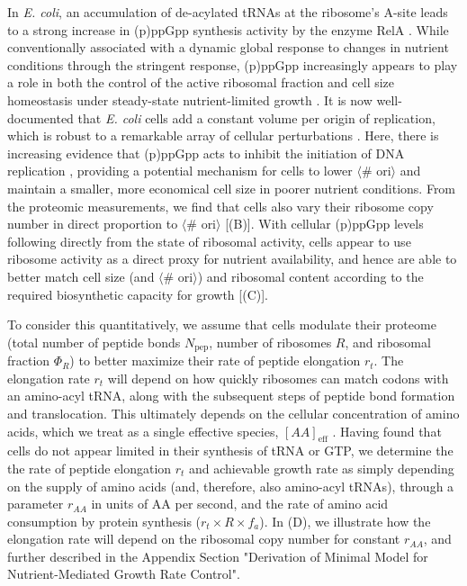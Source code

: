 In \textit{E. coli}, an accumulation of de-acylated tRNAs at the ribosome's
A-site leads to a strong increase in (p)ppGpp synthesis activity by the enzyme
RelA \citep{hauryliuk2015}. While conventionally associated with a dynamic
global response to changes in nutrient conditions through the stringent
response, (p)ppGpp increasingly appears to play a role in both the control of
the active ribosomal fraction and cell size homeostasis under steady-state
nutrient-limited growth \citep{dai2016, zhu2019, Buke2020, vadia2017,
parker2020}. It is now well-documented that \textit{E. coli} cells add a
constant volume per origin of replication, which is robust to a remarkable array
of cellular perturbations \citep{si2017}. Here, there is increasing evidence
that (p)ppGpp acts to inhibit the initiation of DNA replication
\citep{fernandezcoll2020}, providing a potential mechanism for cells to lower
$\langle$\# ori$\rangle$ and maintain a smaller, more economical cell size in
poorer nutrient conditions. From the proteomic measurements, we find that cells
also vary their ribosome copy number in direct proportion to $\langle$\#
ori$\rangle$ [(B)]. With cellular (p)ppGpp levels
following directly from the state of ribosomal activity, cells appear to use
ribosome activity as a direct proxy for nutrient availability, and hence are
able to better match cell size (and $\langle$\# ori$\rangle$) and ribosomal
content according to the required biosynthetic capacity for growth
[(C)].

To consider this quantitatively, we assume that cells modulate their proteome
(total number of peptide bonds $N_\text{pep}$, number of ribosomes $R$, and
ribosomal fraction $\Phi_R$) to better maximize their rate of peptide elongation
$r_t$. The elongation rate $r_t$ will depend on how quickly ribosomes can match
codons with an amino-acyl tRNA, along with the subsequent steps of peptide bond
formation and translocation. This ultimately depends on the cellular
concentration of amino acids, which we treat as a single effective species,
$[AA]_\text{eff}$ \citep{bosdriesz2015}. Having found that cells do not appear limited
in their synthesis of tRNA or GTP, we determine the the rate of peptide elongation
$r_t$ and achievable growth rate as simply depending on the supply of amino
acids (and, therefore, also amino-acyl tRNAs), through a parameter $r_{AA}$ in
units of AA per second, and the rate of amino acid consumption by protein
synthesis ($r_t \times R \times f_a$). In (D), we
illustrate how the elongation rate will depend on the ribosomal copy number for
constant $r_{AA}$, and further described in the Appendix Section
"Derivation of Minimal Model for Nutrient-Mediated Growth Rate Control".

